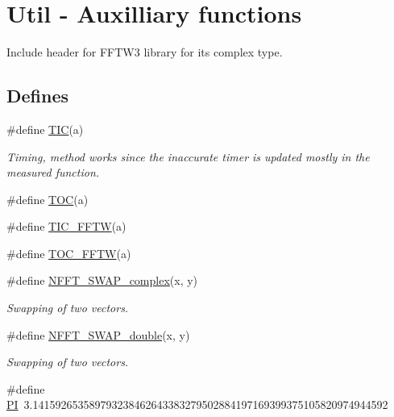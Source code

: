 \hypertarget{group__nfftutil}{
\section{Util - Auxilliary functions}
\label{group__nfftutil}
}
Include header for FFTW3 library for its complex type.  
\subsection*{Defines}
\begin{CompactItemize}
\item 
\#define \hyperlink{group__nfftutil_g05909fc22b7177d1bd50119f40fbb1ec}{TIC}(a)
\begin{CompactList}\small\item\em Timing, method works since the inaccurate timer is updated mostly in the measured function. \item\end{CompactList}\item 
\hypertarget{group__nfftutil_ge1adb0a4004b84a277c80676c8bb6efb}{
\#define \hyperlink{group__nfftutil_ge1adb0a4004b84a277c80676c8bb6efb}{TOC}(a)}
\label{group__nfftutil_ge1adb0a4004b84a277c80676c8bb6efb}

\item 
\hypertarget{group__nfftutil_g165d2a2300a7c50957661f7df0e14ec9}{
\#define \hyperlink{group__nfftutil_g165d2a2300a7c50957661f7df0e14ec9}{TIC\_\-FFTW}(a)}
\label{group__nfftutil_g165d2a2300a7c50957661f7df0e14ec9}

\item 
\hypertarget{group__nfftutil_ga223d5c614418ff5e5f47211b1ef2e22}{
\#define \hyperlink{group__nfftutil_ga223d5c614418ff5e5f47211b1ef2e22}{TOC\_\-FFTW}(a)}
\label{group__nfftutil_ga223d5c614418ff5e5f47211b1ef2e22}

\item 
\#define \hyperlink{group__nfftutil_g4df074728562efbb458f6662e649d1d5}{NFFT\_\-SWAP\_\-complex}(x, y)
\begin{CompactList}\small\item\em Swapping of two vectors. \item\end{CompactList}\item 
\#define \hyperlink{group__nfftutil_g4d8733560ed5e4cc3ff7ecadac62e83e}{NFFT\_\-SWAP\_\-double}(x, y)
\begin{CompactList}\small\item\em Swapping of two vectors. \item\end{CompactList}\item 
\hypertarget{group__nfftutil_g598a3330b3c21701223ee0ca14316eca}{
\#define \hyperlink{group__nfftutil_g598a3330b3c21701223ee0ca14316eca}{PI}~3.141592653589793238462643383279502884197169399375105820974944592}
\label{group__nfftutil_g598a3330b3c21701223ee0ca14316eca}


\end{CompactItemize}
